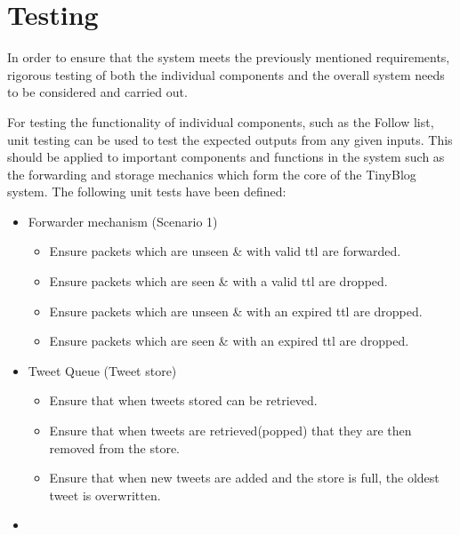 \documentclass{article}
\begin{document}
\section{Testing}
In order to ensure that the system meets the previously mentioned requirements, rigorous testing of both the individual components and the overall system needs to be considered and carried out.

For testing the functionality of individual components, such as the Follow list, unit testing can be used to test the expected outputs from any given inputs. This should be applied to important components and functions in the system such as the forwarding and storage mechanics which form the core of the TinyBlog system.
The following unit tests have been defined:
\begin{itemize}
	\item Forwarder mechanism (Scenario 1)
	\begin{itemize}
		\item Ensure packets which are unseen \& with valid ttl are forwarded.
		\item Ensure packets which are seen \& with a valid ttl are dropped.
		\item Ensure packets which are unseen \& with an expired ttl are dropped.
		\item Ensure packets which are seen \& with an expired ttl are dropped. 
	\end{itemize}
	\item Tweet Queue (Tweet store)
	\begin{itemize}
		\item Ensure that when tweets stored can be retrieved.
		\item Ensure that when tweets are retrieved(popped) that they are then removed from the store.
		\item Ensure that when new tweets are added and the store is full, the oldest tweet is overwritten.
	\end{itemize}
	\item 
\end{itemize}
\end{document}
